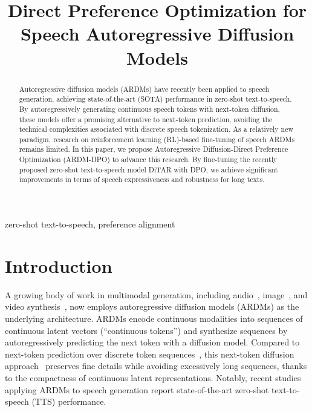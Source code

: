 \documentclass{article}
\title{Direct Preference Optimization for Speech Autoregressive Diffusion Models}
\begin{document}
\ninept
\maketitle

\begin{abstract}
Autoregressive diffusion models (ARDMs) have recently been applied to speech generation, achieving state-of-the-art (SOTA) performance in zero-shot text-to-speech. By autoregressively generating continuous speech tokens with next-token diffusion, these models offer a promising alternative to next-token prediction, avoiding the technical complexities associated with discrete speech tokenization. As a relatively new paradigm, research on reinforcement learning (RL)-based fine-tuning of speech ARDMs remains limited. In this paper, we propose Autoregressive Diffusion-Direct Preference Optimization (ARDM-DPO) to advance this research. By fine-tuning the recently proposed zero-shot text-to-speech model DiTAR with DPO, we achieve significant improvements in terms of speech expressiveness and robustness for long texts.
\end{abstract}

\begin{keywords}
zero-shot text-to-speech, preference alignment
\end{keywords}

\section{Introduction}
\label{sec:intro}

A growing body of work in multimodal generation, including audio~\cite{ARDiT,DiTAR,SongBloom}, image~\cite{MAR,Orthus,NextStep1}, and video synthesis~\cite{CausVid,NOVA,MAGI1}, now employs autoregressive diffusion models (ARDMs) as the underlying architecture. ARDMs encode continuous modalities into sequences of continuous latent vectors (``continuous tokens”) and synthesize sequences by autoregressively predicting the next token with a diffusion model. Compared to next-token prediction over discrete token sequences~\cite{DiscreteTokens,DiscreTalk}, this next-token diffusion approach~\cite{LatentLM} preserves fine details while avoiding excessively long sequences, thanks to the compactness of continuous latent representations. Notably, recent studies~\cite{DiTAR,LatentLM,VibeVoice,DragonFM} applying ARDMs to speech generation report state-of-the-art zero-shot text-to-speech (TTS) performance.
\end{document}
